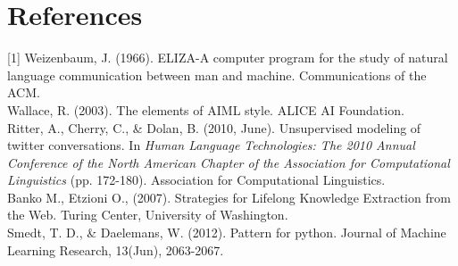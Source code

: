 \documentclass[letterpaper]{article} %
\begin{document}
\section{References}
[1] Weizenbaum, J. (1966). ELIZA-A computer program for the study of natural language communication between man and machine. Communications of the ACM.\\

\noindent[2] Wallace, R. (2003). The elements of AIML style. ALICE AI Foundation.\\

\noindent[3] Ritter, A., Cherry, C., \& Dolan, B. (2010, June). Unsupervised modeling of twitter conversations. In \textit{Human Language Technologies: The 2010 Annual Conference of the North American Chapter of the Association for Computational Linguistics} (pp. 172-180). Association for Computational Linguistics.\\

\noindent[4] Banko M., Etzioni O., (2007). Strategies for Lifelong Knowledge Extraction from the Web. Turing Center, University of Washington.\\

\noindent[5] Smedt, T. D., \& Daelemans, W. (2012). Pattern for python. Journal of Machine Learning Research, 13(Jun), 2063-2067.
\end{document}
